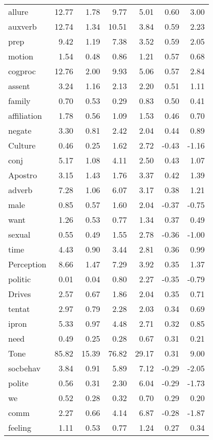 \begin{longtable}{@{}p{3.4cm}rrrrrr@{}}
allure & 12.77 & 1.78 & 9.77 & 5.01 & 0.60 & 3.00 \\
auxverb & 12.74 & 1.34 & 10.51 & 3.84 & 0.59 & 2.23 \\
prep & 9.42 & 1.19 & 7.38 & 3.52 & 0.59 & 2.05 \\
motion & 1.54 & 0.48 & 0.86 & 1.21 & 0.57 & 0.68 \\
cogproc & 12.76 & 2.00 & 9.93 & 5.06 & 0.57 & 2.84 \\
assent & 3.24 & 1.16 & 2.13 & 2.20 & 0.51 & 1.11 \\
family & 0.70 & 0.53 & 0.29 & 0.83 & 0.50 & 0.41 \\
affiliation & 1.78 & 0.56 & 1.09 & 1.53 & 0.46 & 0.70 \\
negate & 3.30 & 0.81 & 2.42 & 2.04 & 0.44 & 0.89 \\
Culture & 0.46 & 0.25 & 1.62 & 2.72 & -0.43 & -1.16 \\
conj & 5.17 & 1.08 & 4.11 & 2.50 & 0.43 & 1.07 \\
Apostro & 3.15 & 1.43 & 1.76 & 3.37 & 0.42 & 1.39 \\
adverb & 7.28 & 1.06 & 6.07 & 3.17 & 0.38 & 1.21 \\
male & 0.85 & 0.57 & 1.60 & 2.04 & -0.37 & -0.75 \\
want & 1.26 & 0.53 & 0.77 & 1.34 & 0.37 & 0.49 \\
sexual & 0.55 & 0.49 & 1.55 & 2.78 & -0.36 & -1.00 \\
time & 4.43 & 0.90 & 3.44 & 2.81 & 0.36 & 0.99 \\
Perception & 8.66 & 1.47 & 7.29 & 3.92 & 0.35 & 1.37 \\
politic & 0.01 & 0.04 & 0.80 & 2.27 & -0.35 & -0.79 \\
Drives & 2.57 & 0.67 & 1.86 & 2.04 & 0.35 & 0.71 \\
tentat & 2.97 & 0.79 & 2.28 & 2.03 & 0.34 & 0.69 \\
ipron & 5.33 & 0.97 & 4.48 & 2.71 & 0.32 & 0.85 \\
need & 0.49 & 0.25 & 0.28 & 0.67 & 0.31 & 0.21 \\
Tone & 85.82 & 15.39 & 76.82 & 29.17 & 0.31 & 9.00 \\
socbehav & 3.84 & 0.91 & 5.89 & 7.12 & -0.29 & -2.05 \\
polite & 0.56 & 0.31 & 2.30 & 6.04 & -0.29 & -1.73 \\
we & 0.52 & 0.28 & 0.32 & 0.70 & 0.29 & 0.20 \\
comm & 2.27 & 0.66 & 4.14 & 6.87 & -0.28 & -1.87 \\
feeling & 1.11 & 0.53 & 0.77 & 1.24 & 0.27 & 0.34 \\

\end{longtable}
